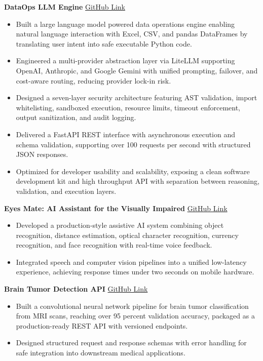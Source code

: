 \documentclass[10pt,letterpaper]{article}
\begin{document}
\textbf{DataOps LLM Engine} \hfill \href{https://github.com/Islam-hady9/dataops-llm-engine}{GitHub Link}
\begin{itemize}
\item Built a large language model powered data operations engine enabling natural language interaction with Excel, CSV, and pandas DataFrames by translating user intent into safe executable Python code.
\item Engineered a multi-provider abstraction layer via LiteLLM supporting OpenAI, Anthropic, and Google Gemini with unified prompting, failover, and cost-aware routing, reducing provider lock-in risk.
\item Designed a seven-layer security architecture featuring AST validation, import whitelisting, sandboxed execution, resource limits, timeout enforcement, output sanitization, and audit logging.
\item Delivered a FastAPI REST interface with asynchronous execution and schema validation, supporting over 100 requests per second with structured JSON responses.
\item Optimized for developer usability and scalability, exposing a clean software development kit and high throughput API with separation between reasoning, validation, and execution layers.
\end{itemize}

\textbf{Eyes Mate: AI Assistant for the Visually Impaired} \hfill \href{https://github.com/Islam-hady9/application-to-help-the-blind-eyes-mate}{GitHub Link}
\begin{itemize}
\item Developed a production-style assistive AI system combining object recognition, distance estimation, optical character recognition, currency recognition, and face recognition with real-time voice feedback.
\item Integrated speech and computer vision pipelines into a unified low-latency experience, achieving response times under two seconds on mobile hardware.
\end{itemize}

\textbf{Brain Tumor Detection API} \hfill \href{https://github.com/Islam-hady9/BrainTumorDetection-API}{GitHub Link}
\begin{itemize}
\item Built a convolutional neural network pipeline for brain tumor classification from MRI scans, reaching over 95 percent validation accuracy, packaged as a production-ready REST API with versioned endpoints.
\item Designed structured request and response schemas with error handling for safe integration into downstream medical applications.
\end{itemize}
\end{document}
